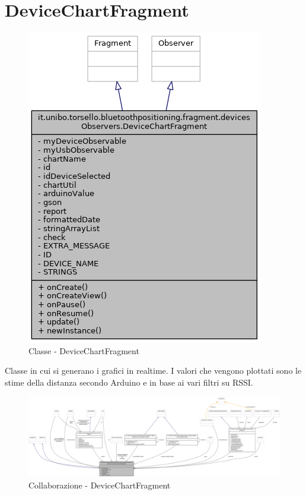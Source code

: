 \section{DeviceChartFragment}
\begin{figure}[ph]
	\centering
	\includegraphics[width=0.5\linewidth]{img/uml/class/classit_1_1unibo_1_1torsello_1_1bluetoothpositioning_1_1fragment_1_1devicesObservers_1_1DeviceChartFragment__inherit__graph.png}
	\caption{Classe - DeviceChartFragment}
\end{figure}

Classe in cui si generano i grafici in realtime. I valori che vengono plottati sono le stime della distanza secondo Arduino e in base ai vari filtri su RSSI.

\begin{figure}[ph]
	\centering
	\includegraphics[width=1.8\linewidth,angle=90]{img/uml/class/classit_1_1unibo_1_1torsello_1_1bluetoothpositioning_1_1fragment_1_1devicesObservers_1_1DeviceChartFragment__coll__graph.png}
	\caption{Collaborazione - DeviceChartFragment}
\end{figure}

\newpage
